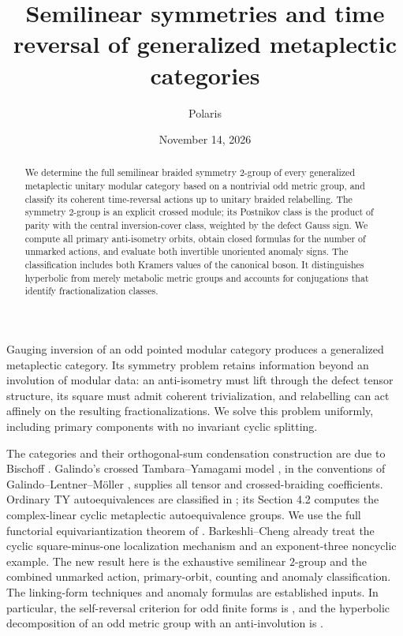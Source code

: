 \documentclass{amsart}
\title[Time reversal of generalized metaplectic categories]
{Semilinear symmetries and time reversal of generalized metaplectic categories}
\author{Polaris}
\date{November 14, 2026}
\theoremstyle{definition}\newtheorem{definition}[theorem]{Definition}
\theoremstyle{remark}\newtheorem{remark}[theorem]{Remark}
\begin{document}
\begin{abstract}
We determine the full semilinear braided symmetry $2$-group of every
generalized metaplectic unitary modular category based on a nontrivial odd
metric group, and classify its coherent time-reversal actions up to unitary
braided relabelling. The symmetry $2$-group is an explicit crossed module;
its Postnikov class is the product of parity with the central inversion-cover
class, weighted by the defect Gauss sign. We compute all primary
anti-isometry orbits, obtain closed formulas for the number of unmarked
actions, and evaluate both invertible unoriented anomaly signs. The
classification includes both Kramers values of the canonical boson.
It distinguishes hyperbolic from merely metabolic metric groups and
accounts for conjugations that identify fractionalization classes.
\end{abstract}
\maketitle

Gauging inversion of an odd pointed modular category produces a generalized
metaplectic category. Its symmetry problem retains information beyond an
involution of modular data: an anti-isometry must lift through the defect
tensor structure, its square must admit coherent trivialization, and
relabelling can act affinely on the resulting fractionalizations. We solve
this problem uniformly, including primary components with no invariant
cyclic splitting.

The categories and their orthogonal-sum condensation construction are due to
Bischoff \cite{Bis}. Galindo's crossed Tambara--Yamagami model \cite{Gal},
in the conventions of Galindo--Lentner--M\"oller \cite{GLM}, supplies all
tensor and crossed-braiding coefficients. Ordinary TY autoequivalences
are classified in \cite[Lemma 2.16]{EM}; its Section 4.2 computes the
complex-linear cyclic metaplectic autoequivalence groups. We use the
full functorial equivariantization theorem of \cite[Theorem 4.44]{DGNO}.
Barkeshli--Cheng \cite{BC} already treat the cyclic square-minus-one
localization mechanism and an exponent-three noncyclic example. The new
result here is the exhaustive semilinear $2$-group and the combined
unmarked action, primary-orbit, counting and anomaly classification.
The linking-form techniques and anomaly formulas are established inputs.
In particular, the self-reversal criterion for odd finite forms is
\cite[Proposition 3.2]{GM}, and the hyperbolic decomposition of an odd
metric group with an anti-involution is \cite[Section 4]{LT}.
\end{document}
